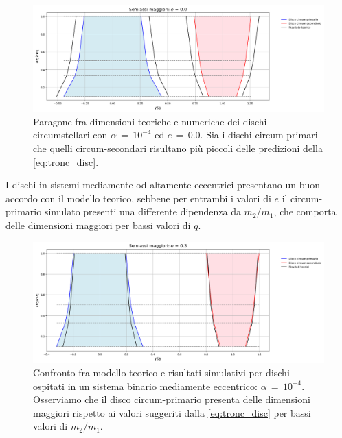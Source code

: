 \begin{figure}[H]
  \centering
  \includegraphics[width=\textwidth]{Immagini/Confronto/confax_A4_e0.png}
  \caption{Paragone fra dimensioni teoriche e numeriche dei dischi circumstellari con $\alpha\,=\,10^{-4}$ ed $e\,=\,0.0$. Sia i dischi circum-primari che quelli circum-secondari risultano più piccoli delle predizioni della \eqref{eq:tronc_disc}.}
  \label{fig:conf_ax40}
\end{figure}

I dischi in sistemi mediamente od altamente eccentrici presentano un buon accordo con il modello teorico, sebbene per entrambi i valori di $e$ il circum-primario simulato presenti una differente dipendenza da $m_2/m_1$, che comporta delle dimensioni maggiori per bassi valori di $q$. 

\begin{figure}[H]
  \centering
  \includegraphics[width=\textwidth]{Immagini/Confronto/confax_A4_e3.png}
  \caption{Confronto fra modello teorico e risultati simulativi per dischi ospitati in un sistema binario mediamente eccentrico: $\alpha\,=\,10^{-4}$. Osserviamo che il disco circum-primario presenta delle dimensioni maggiori rispetto ai valori suggeriti dalla \eqref{eq:tronc_disc} per bassi valori di $m_2/m_1$.}
  \label{fig:conf_ax43}
\end{figure}

